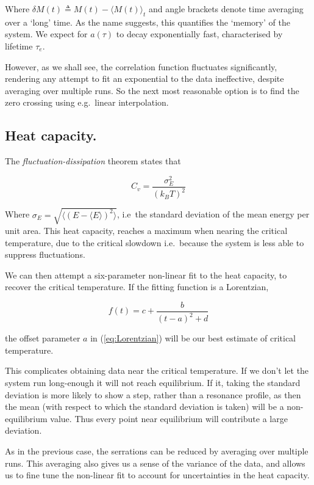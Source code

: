 \documentclass[12pt]{article}
\begin{document}
Where \( \delta M(t) \triangleq M(t) - \langle  M(t) \rangle_t \) and angle brackets denote time averaging over a `long' time. As the name suggests, this quantifies the `memory' of the system. We expect for \(a (\tau)\) to decay exponentially fast, characterised by lifetime \( \tau_e\).

However, as we shall see, the correlation function fluctuates significantly, rendering any attempt to fit an exponential to the data ineffective, despite averaging over multiple runs. So the next most reasonable option is to find the zero crossing using e.g.~linear interpolation. 

\subsection{Heat capacity.}\label{sec:heat_capacity}

The \emph{fluctuation-dissipation} theorem states that

\begin{equation}\label{eq:fluctuation-dissipation theorem}
  C_v = \frac{\sigma_E^2}{ {(k_B T)}^2}
\end{equation}

Where \( \sigma_E = \sqrt{\langle  {(E - \langle E \rangle)}^2 \rangle}\), i.e~the standard deviation of the mean energy per unit area. This heat capacity, reaches a maximum when nearing the critical temperature, due to the critical slowdown i.e.~because the system is less able to suppress fluctuations.

We can then attempt a six-parameter non-linear fit to the heat capacity, to recover the critical temperature. If the fitting function is a Lorentzian,

\begin{equation}\label{eq:Lorentzian}
  f(t) = c + \frac{b}{{(t - a)}^2 + d}
\end{equation}

the offset parameter \(a\) in (\ref{eq:Lorentzian}) will be our best estimate of critical temperature. 

This complicates obtaining data near the critical temperature. If we don't let the system run long-enough it will not reach equilibrium. If it, taking the standard deviation is more likely to show a step, rather than a resonance profile, as then the mean (with respect to which the standard deviation is taken) will be a non-equilibrium value. Thus every point near equilibrium will contribute a large deviation.

As in the previous case, the serrations can be reduced by averaging over multiple runs. This averaging also gives us a sense of the variance of the data, and allows us to fine tune the non-linear fit to account for uncertainties in the heat capacity.
\end{document}
